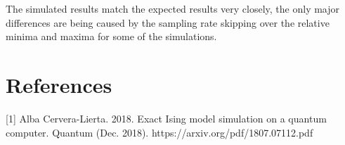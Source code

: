 \documentclass[12pt]{article}
\begin{document}
    The simulated results match the expected results very closely, the only major differences are being caused by the sampling rate skipping over the relative minima and maxima for some of the simulations.

    \section{References}
    [1] Alba Cervera-Lierta. 2018. Exact Ising model simulation on a quantum computer.
Quantum (Dec. 2018). https://arxiv.org/pdf/1807.07112.pdf
\end{document}
